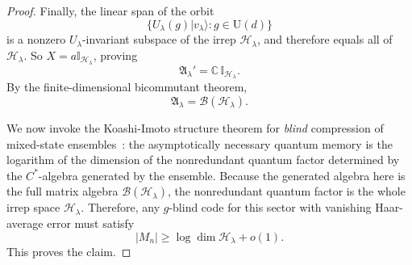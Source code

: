 \documentclass[a4paper,onecolumn,11pt]{quantumarticle}
\def\h{\mathcal{H}}
\def\id{\mathbb{I}}
\begin{document}
\begin{proof}
Finally, the linear span of the orbit
\begin{equation}
\{U_\lambda(g)|v_\lambda\rangle : g\in \mathrm U(d)\}
\end{equation}
is a nonzero $U_\lambda$-invariant subspace of the irrep $\h_\lambda$, and therefore equals all of $\h_\lambda$.
So $X=a\id_{\h_\lambda}$, proving
\begin{equation}
    \mathfrak A_\lambda'=\mathbb C\, \id_{\h_\lambda}.
\end{equation}
By the finite-dimensional bicommutant theorem,
\begin{equation}
    \mathfrak A_\lambda = \mathcal B(\h_\lambda).
\end{equation}

We now invoke the Koashi-Imoto structure theorem for \emph{blind} compression of mixed-state ensembles~\cite{koashi2001compressibility,koashi2001possible}:
the asymptotically necessary quantum memory is the logarithm of the dimension of the nonredundant quantum factor determined by the $C^*$-algebra generated by the ensemble.
Because the generated algebra here is the full matrix algebra $\mathcal B(\h_\lambda)$, the nonredundant quantum factor is the whole irrep space $\h_\lambda$.
Therefore, any $g$-blind code for this sector with vanishing Haar-average error must satisfy
\begin{equation}
    |M_n| \ge \log \dim \h_\lambda + o(1).
\end{equation}
This proves the claim.
\end{proof}
\end{document}
